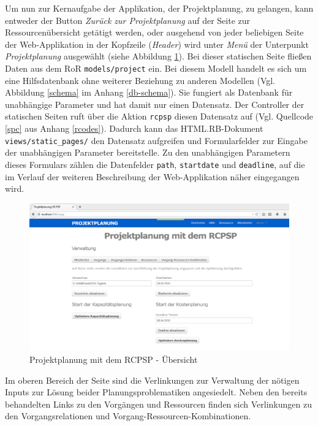 \documentclass[a4paper,12pt,parskip,bibtotoc,liststotoc]{article}
\begin{document}
Um nun zur Kernaufgabe der Applikation, der Projektplanung, zu gelangen, kann entweder der Button \textit{Zurück zur Projektplanung} auf der Seite zur Ressourcenübersicht getätigt werden, oder ausgehend von jeder beliebigen Seite der Web-Applikation in der Kopfzeile (\textit{Header}) wird unter \textit{Menü} der Unterpunkt \textit{Projektplanung} ausgewählt (siehe Abbildung \ref{RCPSP}). Bei dieser statischen Seite fließen Daten aus dem RoR \texttt{models/project} ein. Bei diesem Modell handelt es sich um eine Hilfsdatenbank ohne weiterer Beziehung zu anderen Modellen (Vgl. Abbildung \ref{schema} im Anhang \ref{db-schema}). Sie fungiert als Datenbank für unabhängige Parameter und hat damit nur einen Datensatz. Der Controller der statischen Seiten ruft über die Aktion \texttt{rcpsp} diesen Datensatz auf (Vgl. Quellcode \ref{spc} aus Anhang \ref{rcodes}). Dadurch kann das HTML.RB-Dokument \texttt{views/static\_pages/} den Datensatz aufgreifen und Formularfelder zur Eingabe der unabhängigen Parameter bereitstelle. Zu den unabhängigen Parametern dieses Formulars zählen die Datenfelder \texttt{path}, \texttt{startdate} und \texttt{deadline}, auf die im Verlauf der weiteren Beschreibung der Web-Applikation näher eingegangen wird.\\ %


\begin{figure}[h!]
  \begin{center}
    \includegraphics[width=120mm]{Bilder/Projektplanung.png}
    \caption{Projektplanung mit dem RCPSP - Übersicht}  \label{RCPSP}
  \end{center}
\end{figure}

Im oberen Bereich der Seite sind die Verlinkungen zur Verwaltung der nötigen Inputs zur Lösung beider Planungsproblematiken angesiedelt. Neben den bereits behandelten Links zu den Vorgängen und Ressourcen finden sich Verlinkungen zu den Vorgangsrelationen und Vorgang-Ressourcen-Kombinationen.\\ 
\end{document}
